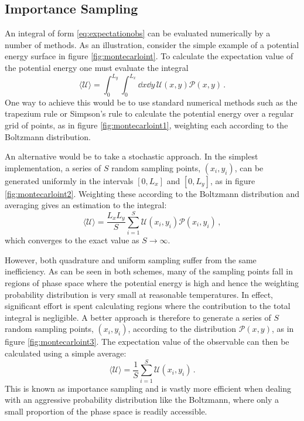 \subsection{Importance Sampling}

An integral of form \eqref{eq:expectationobs} can be evaluated numerically by a number of methods.
As an illustration, consider the simple example of a \td{} potential energy surface in figure \ref{fig:montecarloint}.
To calculate the expectation value of the potential energy one must evaluate the integral
\begin{equation}
	\langle \mathcal{U} \rangle = \int_{0}^{L_y}\int_{0}^{L_x} \dd x \dd y\, \mathcal{U}\left(x,y\right)\mathcal{P}\left(x,y\right)\,.
\end{equation}
One way to achieve this would be to use standard numerical methods such as the trapezium rule or Simpson's rule to calculate the potential energy over a regular grid of points, as in figure \ref{fig:montecarloint1}, weighting each according to the Boltzmann distribution.

An alternative would be to take a stochastic approach.
In the simplest implementation, a series of $S$ random sampling points, $\left(x_i,y_i\right)$, can be generated uniformly in the intervals $\left[0,L_x\right]$ and $\left[0,L_y\right]$, as in figure \ref{fig:montecarloint2}.
Weighting these according to the Boltzmann distribution and averaging gives an estimation to the integral:
\begin{equation}
	\langle \mathcal{U} \rangle = \frac{L_xL_y}{S}\sum_{i=1}^{S} \mathcal{U}\left(x_i,y_i\right)\mathcal{P}\left(x_i,y_i\right)\,,
\end{equation}
which converges to the exact value as $S\rightarrow\infty$.

However, both quadrature and \mc{} uniform sampling suffer from the same inefficiency.
As can be seen in both schemes, many of the sampling points fall in regions of phase space where the potential energy is high and hence the weighting probability distribution is very small at reasonable temperatures.
In effect, significant effort is spent calculating regions where the contribution to the total integral is negligible.
A better approach is therefore to generate a series of $S$ random sampling points, $\left(x_i,y_i\right)$, according to the distribution $\mathcal{P}\left(x,y\right)$, as in figure \ref{fig:montecarloint3}.
The expectation value of the observable can then be calculated using a simple average:
\begin{equation}
	\langle \mathcal{U} \rangle = \frac{1}{S}\sum_{i=1}^{S} \mathcal{U}\left(x_i,y_i\right)\,.
\end{equation}
This is known as importance sampling and is vastly more efficient when dealing with an aggressive probability distribution like the Boltzmann, where only a small proportion of the phase space is readily accessible.

